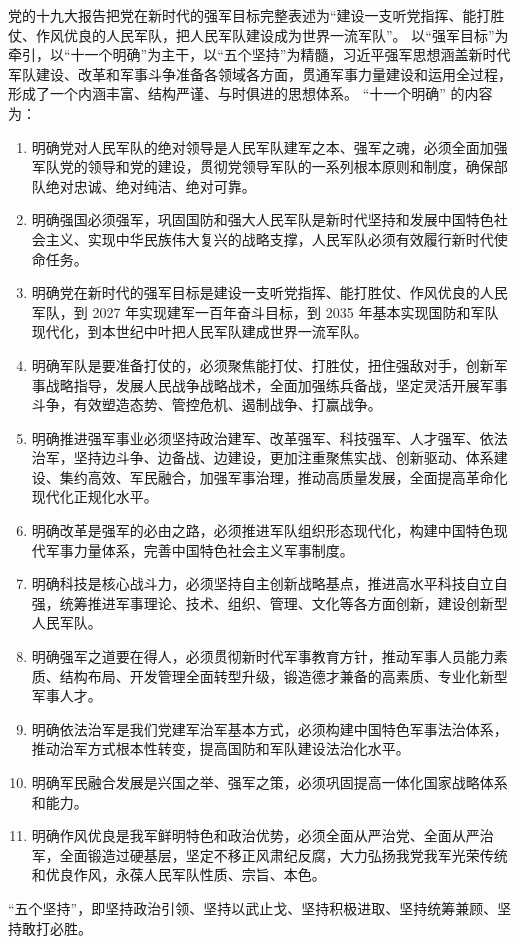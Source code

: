 \documentclass[10pt, UTF8]{ctexbook} %
\begin{document}
党的十九大报告把党在新时代的强军目标完整表述为“建设一支听党指挥、能打胜仗、作风优良的人民军队，把人民军队建设成为世界一流军队”。
以“强军目标”为牵引，以“十一个明确”为主干，以“五个坚持”为精髓，习近平强军思想涵盖新时代军队建设、改革和军事斗争准备各领域各方面，贯通军事力量建设和运用全过程，形成了一个内涵丰富、结构严谨、与时俱进的思想体系。
“十一个明确” 的内容为：
\begin{enumerate}[label=(\arabic*)]
    \item 明确党对人民军队的绝对领导是人民军队建军之本、强军之魂，必须全面加强军队党的领导和党的建设，贯彻党领导军队的一系列根本原则和制度，确保部队绝对忠诚、绝对纯洁、绝对可靠。
    \item 明确强国必须强军，巩固国防和强大人民军队是新时代坚持和发展中国特色社会主义、实现中华民族伟大复兴的战略支撑，人民军队必须有效履行新时代使命任务。
    \item 明确党在新时代的强军目标是建设一支听党指挥、能打胜仗、作风优良的人民军队，到 2027 年实现建军一百年奋斗目标，到 2035 年基本实现国防和军队现代化，到本世纪中叶把人民军队建成世界一流军队。
    \item 明确军队是要准备打仗的，必须聚焦能打仗、打胜仗，扭住强敌对手，创新军事战略指导，发展人民战争战略战术，全面加强练兵备战，坚定灵活开展军事斗争，有效塑造态势、管控危机、遏制战争、打赢战争。
    \item 明确推进强军事业必须坚持政治建军、改革强军、科技强军、人才强军、依法治军，坚持边斗争、边备战、边建设，更加注重聚焦实战、创新驱动、体系建设、集约高效、军民融合，加强军事治理，推动高质量发展，全面提高革命化现代化正规化水平。
    \item 明确改革是强军的必由之路，必须推进军队组织形态现代化，构建中国特色现代军事力量体系，完善中国特色社会主义军事制度。
    \item 明确科技是核心战斗力，必须坚持自主创新战略基点，推进高水平科技自立自强，统筹推进军事理论、技术、组织、管理、文化等各方面创新，建设创新型人民军队。
    \item 明确强军之道要在得人，必须贯彻新时代军事教育方针，推动军事人员能力素质、结构布局、开发管理全面转型升级，锻造德才兼备的高素质、专业化新型军事人才。
    \item 明确依法治军是我们党建军治军基本方式，必须构建中国特色军事法治体系，推动治军方式根本性转变，提高国防和军队建设法治化水平。
    \item 明确军民融合发展是兴国之举、强军之策，必须巩固提高一体化国家战略体系和能力。
    \item 明确作风优良是我军鲜明特色和政治优势，必须全面从严治党、全面从严治军，全面锻造过硬基层，坚定不移正风肃纪反腐，大力弘扬我党我军光荣传统和优良作风，永葆人民军队性质、宗旨、本色。
\end{enumerate}
“五个坚持”，即坚持政治引领、坚持以武止戈、坚持积极进取、坚持统筹兼顾、坚持敢打必胜。
\end{document}
